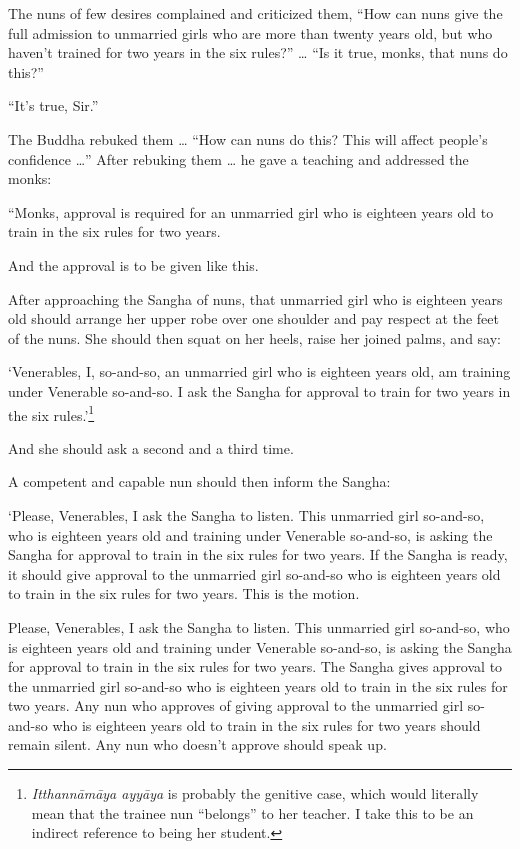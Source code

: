 \documentclass[12pt,openany]{book}%
\begin{document}
The nuns of few desires complained and criticized them, “How can nuns give the full admission to unmarried girls who are more than twenty years old, but who haven’t trained for two years in the six rules?” … “Is it true, monks, that nuns do this?” 

“It’s true, Sir.” 

The Buddha rebuked them … “How can nuns do this? This will affect people’s confidence …” After rebuking them … he gave a teaching and addressed the monks: 

“Monks, approval is required for an unmarried girl who is eighteen years old to train in the six rules for two years. 

And the approval is to be given like this. 

After approaching the Sangha of nuns, that unmarried girl who is eighteen years old should arrange her upper robe over one shoulder and pay respect at the feet of the nuns. She should then squat on her heels, raise her joined palms, and say: 

‘Venerables, I, so-and-so, an unmarried girl who is eighteen years old, am training under Venerable so-and-so. I ask the Sangha for approval to train for two years in the six rules.’\footnote{\textit{\textsanskrit{Itthannāmāya} \textsanskrit{ayyāya}} is probably the genitive case, which would literally mean that the trainee nun “belongs” to her teacher. I take this to be an indirect reference to being her student. } 

And she should ask a second and a third time. 

A competent and capable nun should then inform the Sangha: 

‘Please, Venerables, I ask the Sangha to listen. This unmarried girl so-and-so, who is eighteen years old and training under Venerable so-and-so, is asking the Sangha for approval to train in the six rules for two years. If the Sangha is ready, it should give approval to the unmarried girl so-and-so who is eighteen years old to train in the six rules for two years. This is the motion. 

Please, Venerables, I ask the Sangha to listen. This unmarried girl so-and-so, who is eighteen years old and training under Venerable so-and-so, is asking the Sangha for approval to train in the six rules for two years. The Sangha gives approval to the unmarried girl so-and-so who is eighteen years old to train in the six rules for two years. Any nun who approves of giving approval to the unmarried girl so-and-so who is eighteen years old to train in the six rules for two years should remain silent. Any nun who doesn’t approve should speak up. 
\end{document}
